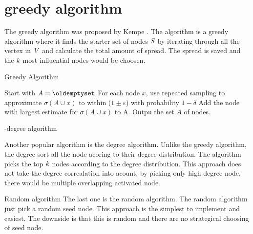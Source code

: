 \section{greedy algorithm}
The  greedy algorithm was proposed by Kempe \cite{MaximizeSpread2015}. The algorithm is a greedy algorithm where it finds the starter set of nodes $\it{S}$ by iterating through all the vertex in $\it{V}$ and calculate the total amount of spread. The spread is saved and the $\it{k}$ most influential nodes would be choosen.

 \begin{algorithm}
\caption{Greedy Algorithm}
\begin{algorithmic}[1]
\State Start with $A = \oldemptyset$
\State For each node $x$, use repeated sampling to approximate $\sigma(A \cup {x}) $ to within ($1 \pm \varepsilon$) with probability
$1 − \delta$
\State Add the node with largest estimate for $\sigma(A \cup {x})$ to A.
\EndWhile
\State Outpu the set $A$ of nodes.
\end{algorithmic}
\end{algorithm}

-degree algorithm

Another popular algorithm is the degree algorithm\cite{MaximizeSpread2015}. Unlike the greedy algorithm, the degree sort all the node acoring to their degree distribution. The algorithm picks the top $\it{k}$ nodes according to the degree distribution. This approach does not take the degree correalation into acount, by picking only high degree node, there would be multiple overlapping activated node.


Random algorithm
The last one is the random algorithm. The random algorithm just pick a random seed node. This approach is the simplest to implement and easiest. The downside is that this is random and there are no strategical choosing of seed node. 


